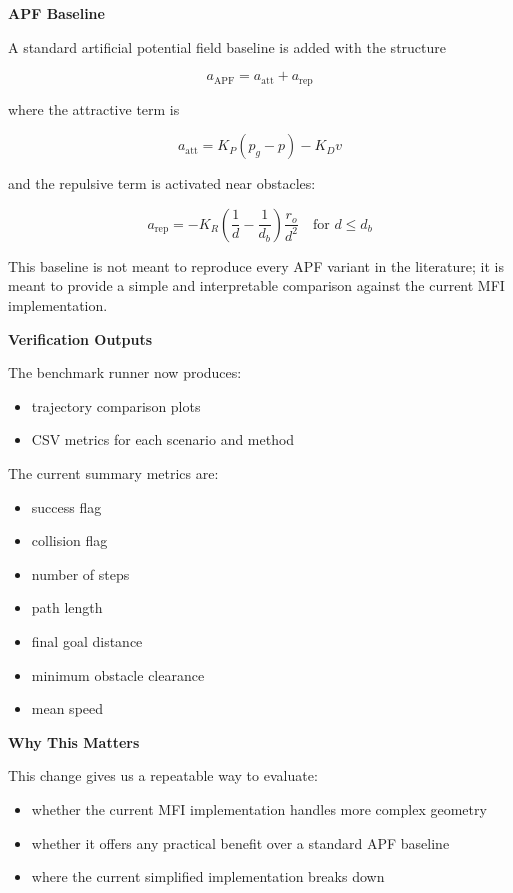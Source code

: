 \documentclass[11pt]{article}
\begin{document}
\textbf{APF Baseline}

A standard artificial potential field baseline is added with the structure

\begin{equation}
a_{\text{APF}} = a_{\text{att}} + a_{\text{rep}}
\end{equation}

where the attractive term is

\begin{equation}
a_{\text{att}} = K_P (p_g - p) - K_D v
\end{equation}

and the repulsive term is activated near obstacles:

\begin{equation}
a_{\text{rep}}
=
-K_R \left(\frac{1}{d} - \frac{1}{d_b}\right)\frac{r_o}{d^2}
\quad \text{for } d \le d_b
\end{equation}

This baseline is not meant to reproduce every APF variant in the literature; it
is meant to provide a simple and interpretable comparison against the current
MFI implementation.

\textbf{Verification Outputs}

The benchmark runner now produces:

\begin{itemize}[leftmargin=*]
  \item trajectory comparison plots
  \item CSV metrics for each scenario and method
\end{itemize}

The current summary metrics are:

\begin{itemize}[leftmargin=*]
  \item success flag
  \item collision flag
  \item number of steps
  \item path length
  \item final goal distance
  \item minimum obstacle clearance
  \item mean speed
\end{itemize}

\textbf{Why This Matters}

This change gives us a repeatable way to evaluate:

\begin{itemize}[leftmargin=*]
  \item whether the current MFI implementation handles more complex geometry
  \item whether it offers any practical benefit over a standard APF baseline
  \item where the current simplified implementation breaks down
\end{itemize}
\end{document}
